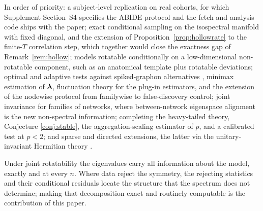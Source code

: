 In order of priority: a subject-level replication on real cohorts,
for which Supplement Section~S4 specifies the ABIDE protocol and the
fetch and analysis code ships with the paper; exact conditional sampling on the isospectral manifold with fixed
diagonal, and the extension of Proposition~\ref{prop:hollowrate} to
the finite-$T$ correlation step, which together would close the
exactness gap of Remark~\ref{rem:hollow}; models rotatable conditionally on a
low-dimensional non-rotatable component, such as an anatomical template
plus rotatable deviations; optimal and adaptive tests against spiked-graphon alternatives
\citep{onatski2013asymptotic,perry2018optimality}, minimax estimation of $\bm{\lambda}$, fluctuation theory for the plug-in
estimators, and the extension of the nodewise protocol from
familywise to false-discovery control; joint invariance for
families of networks, where between-network eigenspace alignment is
the new non-spectral information; completing the heavy-tailed theory, Conjecture
\ref{conj:stable}, the aggregation-scaling estimator of $p$, and a
calibrated test at $p<2$; and sparse and directed extensions, the
latter via the unitary-invariant Hermitian theory
\citep{olshanski1996ergodic,vershik2002}.

Under joint rotatability the eigenvalues carry all information about the
model, exactly and at every $n$. Where data reject the symmetry, the
rejecting statistics and their conditional residuals locate the structure
that the spectrum does not determine; making that decomposition exact and
routinely computable is the contribution of this paper.
